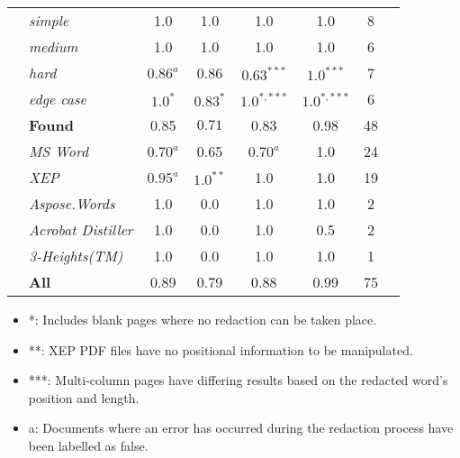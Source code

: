 \begin{table}[h]
\begin{tabular}{llcccccl}
 & \multicolumn{1}{l|}{\textit{simple}} & 1.0 & 1.0 & 1.0 & 1.0 &  8 & \\
 & \multicolumn{1}{l|}{\textit{medium}} & 1.0 & 1.0 & 1.0 & 1.0 &  6 & \\
 & \multicolumn{1}{l|}{\textit{hard}} & $0.86^{a}$ & 0.86 & $0.63^{***}$ & $1.0^{***}$ & 7 & \\
 & \multicolumn{1}{l|}{\textit{edge case}} & $1.0^{*}$ & $0.83^{*}$ & $1.0^{*,***}$ & $1.0^{*,***}$ & 6 & \\
 & \multicolumn{1}{l|}{\textbf{Found}} & 0.85 & $0.71$ & 0.83 & 0.98 & 48 &  \\
 & \multicolumn{1}{l|}{\textit{MS Word}} & $0.70^{a}$ & 0.65 & $0.70^{a}$ & 1.0 & 24 &  \\
 & \multicolumn{1}{l|}{\textit{XEP}} & $0.95^{a}$ & $1.0^{**}$ & 1.0 & 1.0 & 19 &  \\
 & \multicolumn{1}{l|}{\textit{Aspose.Words}} & 1.0 & 0.0 & 1.0 & 1.0 & 2 &  \\
 & \multicolumn{1}{l|}{\textit{Acrobat Distiller}} & 1.0 & 0.0 & 1.0 & 0.5 & 2 &  \\
 & \multicolumn{1}{l|}{\textit{3-Heights(TM)}} & 1.0 & 0.0 & 1.0 & 1.0 & 1 &  \\
 & \multicolumn{1}{l|}{\textbf{All}} & 0.89 & 0.79 & 0.88 & 0.99 & 75 &
\end{tabular}
\label{tab:redaction-res}
\end{table}

\begin{itemize}
    \item *: Includes blank pages where no redaction can be taken place. 
    \item **: XEP PDF files have no positional information to be manipulated. 
    \item ***: Multi-column pages have differing results based on the redacted word's position and length.
    \item a: Documents where an error has occurred during the redaction process have been labelled as false.
\end{itemize}
\newpage
